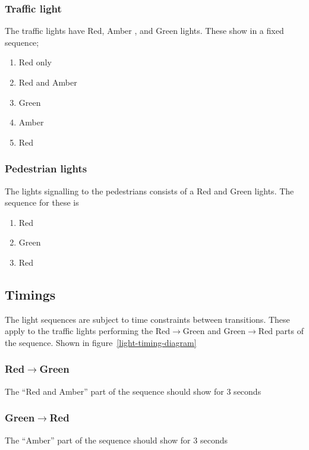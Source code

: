 \documentclass{article}
\begin{document}
\subsubsection{Traffic light}
The traffic lights have Red, Amber
, and
Green lights.  These show in a fixed sequence;
\begin{enumerate}
	\item Red only
	\item Red and Amber
	\item Green
	\item Amber
	\item Red
\end{enumerate}

\subsubsection{Pedestrian lights}
The lights signalling to the pedestrians consists of a Red and Green lights.
The sequence for these is
\begin{enumerate}
	\item Red
	\item Green
	\item Red
\end{enumerate}

\subsection{Timings}\label{time-constraint}
The light sequences are subject to time constraints between transitions. 
These apply to the traffic lights performing the Red$\rightarrow$Green and
Green$\rightarrow$Red parts of the sequence.  Shown in  figure~\ref{light-timing-diagram}

\subsubsection{Red$\rightarrow$Green}
The ``Red and Amber'' part of the sequence should show for 3 seconds

\subsubsection{Green$\rightarrow$Red}
The ``Amber'' part of the sequence should show for 3 seconds
\end{document}
